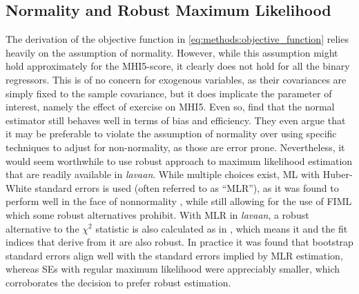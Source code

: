 \subsection{Normality and Robust Maximum Likelihood}
\label{sec:methods:normality_mlr}
The derivation of the objective function in \cref{eq:methods:objective_function} relies heavily on the assumption
of normality. However, while this assumption might hold approximately for the MHI5-score, it clearly does not hold
for all the binary regressors. This is of no concern for exogenous variables, as their covariances are simply fixed
to the sample covariance, but it does implicate the parameter of interest, namely the effect of exercise on MHI5.
Even so,  find that the normal estimator still behaves well in terms of bias and
efficiency. They even argue that it may be preferable to violate the assumption of normality over using specific
techniques to adjust for non-normality, as those are error prone.
Nevertheless, it would seem worthwhile to use robust approach to maximum likelihood estimation that are readily
available in \textit{lavaan}. While multiple choices exist, ML with Huber-White standard errors is used (often
referred to as ``MLR''), as it was found to perform well in the face of nonnormality \cite{zhong2011bias}, while
still allowing for the use of FIML which some robust alternatives prohibit.
With MLR in \textit{lavaan}, a robust alternative to the $\chi^2$ statistic is also calculated as in ,
which means it and the fit indices that derive from it are also robust.
In practice it was found that bootstrap standard errors align well with the standard errors implied by MLR estimation,
whereas SEs with regular maximum likelihood were appreciably smaller, which corroborates the decision to prefer
robust estimation.
